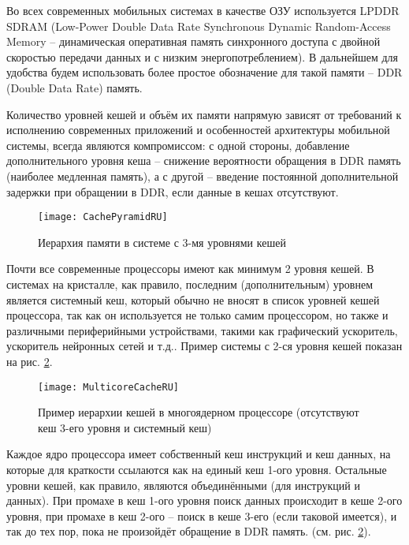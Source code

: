     Во всех современных мобильных системах в качестве ОЗУ используется LPDDR SDRAM
    (Low-Power Double Data Rate Synchronous Dynamic Random-Access Memory --
    динамическая оперативная память синхронного доступа с двойной скоростью передачи данных и
    с низким энергопотреблением). В дальнейшем для удобства будем использовать более простое
    обозначение для такой памяти -- DDR (Double Data Rate) память.

    Количество уровней кешей и объём их памяти напрямую зависят от требований к исполнению
    современных приложений и особенностей архитектуры мобильной системы,
    всегда являются компромиссом: с одной стороны, добавление дополнительного
    уровня кеша -- снижение вероятности обращения в DDR память (наиболее медленная память),
    а с другой -- введение постоянной дополнительной задержки при обращении в DDR, если данные
    в кешах отсутствуют.

    \begin{figure}[!h]
        \caption{Иерархия памяти в системе с 3-мя уровнями кешей}
        \centering
        \texttt{[image: CachePyramidRU]}
        \label{CachePyramid}
    \end{figure}

    Почти все современные процессоры имеют как минимум 2 уровня кешей. В системах на кристалле,
    как правило, последним (дополнительным) уровнем является системный кеш, который обычно
    не вносят в список уровней кешей процессора, так как он используется не только самим процессором,
    но также и различными периферийными устройствами, такими как графический ускоритель, ускоритель
    нейронных сетей и т.д.. Пример системы с 2-ся уровня кешей показан на рис. \ref{MulticoreCache}.

    \begin{figure}[!h]
        \caption{Пример иерархии кешей в многоядерном процессоре (отсутствуют кеш 3-его уровня
            и системный кеш)}
        \centering
        \texttt{[image: MulticoreCacheRU]}
        \label{MulticoreCache}
    \end{figure}

    Каждое ядро процессора имеет собственный кеш инструкций и кеш данных, на которые для краткости
    ссылаются как на единый кеш 1-ого уровня. Остальные уровни кешей, как правило, являются объединёнными
    (для инструкций и данных).
    При промахе в кеш 1-ого уровня поиск данных происходит в кеше 2-ого уровня, при промахе
    в кеш 2-ого -- поиск в кеше 3-его (если таковой имеется), и так до тех пор, пока не произойдёт
    обращение в DDR память. (см. рис. \ref{MulticoreCache}).

